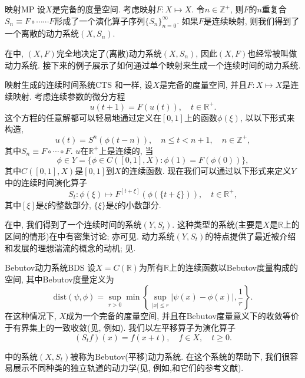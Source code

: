 \begin{example}{映射}{MP}
	设$X$是完备的度量空间. 考虑映射$F:X\mapsto X$. 令$n\in\mathbb{Z}^{+}$, 则$F$的$n$重复合$S_{n}\equiv F\circ\cdots\cdots F$形成了一个演化算子序列$\{S_{n}\}_{n=0}^{\infty}$. 如果$F$是连续映射, 则我们得到了一个离散的动力系统$(X,S_{n})$. 
\end{example}

在中, $(X,F)$完全地决定了(离散)动力系统$(X,S_{n})$, 因此$(X,F)$也经常被叫做动力系统. 接下来的例子展示了如何通过单个映射来生成一个连续时间的动力系统. 

\begin{example}{映射生成的连续时间系统}{CTS}
	和一样, 设$X$是完备的度量空间, 并且$F:X\mapsto X$是连续映射. 考虑连续参数的微分方程$$u(t+1)=F(u(t)),\quad t\in\mathbb{R}^{+}.$$这个方程的任意解都可以轻易地通过定义在$[0,1]$上的函数$\phi(\xi)$, 以以下形式来构造, $$u(t)=S^{n}(\phi(t-n)),\quad n\leqslant t<n+1,\quad n\in\mathbb{Z}^{+},$$其中$S_{n}\equiv F\circ\cdots\circ F$. $u$在$\mathbb{R}^{+}$上是连续的, 当$$\phi\in Y=\{\phi\in C([0,1],X):\phi(1)=F(\phi(0))\},$$其中$C([0,1],X)$是$[0,1]$到$X$的连续函数. 现在我们可以通过以下形式来定义$Y$中的连续时间演化算子$$S_{t}:\phi(\xi)\mapsto F^{[t+\xi]}(\phi(\{t+\xi\})),\quad t\in\mathbb{R}^{+},$$其中$[\xi]$是$\xi$的整数部分, $\{\xi\}$是$\xi$的小数部分. 
\end{example}

在中, 我们得到了一个连续时间的系统$(Y,S_{t})$. 这种类型的系统(主要是$X$是$\mathbb{R}$上的区间的情形)在\cite{Sharkovsky86}中有密集讨论; 亦可见\cite{Sharkovsky89}. 动力系统$(Y,S_{t})$的特点提供了最近被介绍和发展的理想湍流的概念的动机; 见\cite{Sharkovsky06}. 

\begin{example}{Bebutov动力系统}{BDS}
	设$X=C(\mathbb{R})$为所有$\mathbb{R}$上的连续函数以Bebutov度量构成的空间, 其中Bebutov度量定义为$$\mathrm{dist}(\psi,\phi)=\sup_{r>0}\min\left\{\sup_{|x|\leqslant r}|\psi(x)-\phi(x)|,\frac{1}{r}\right\}.$$在这种情况下, $X$成为一个完备的度量空间, 并且在Bebutov度量意义下的收敛等价于有界集上的一致收敛(见, 例如\cite{Sibirsky75}). 我们以左平移算子为演化算子$$(S_{t}f)(x)=f(x+t),\quad f\in X,\quad t\geqslant 0.$$
\end{example}

中的系统$(X,S_{t})$被称为Bebutov(平移)动力系统. 在这个系统的帮助下, 我们很容易展示不同种类的独立轨道的动力学(见, 例如\cite{Nemytskii60},\cite{Sibirsky75}和它们的参考文献). 

